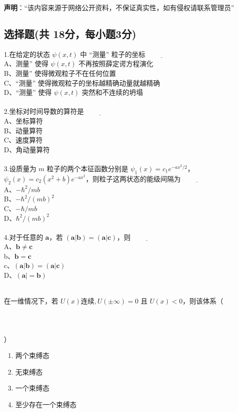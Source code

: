 
\textbf{声明}：“该内容来源于网络公开资料，不保证真实性，如有侵权请联系管理员”

\subsection{选择题(共 18分，每小题3分)}

1.在给定的状态 $\psi(x,t)$ 中 “测量” 粒子的坐标$\underline{\hspace{2cm}}$\\
    A、测量” 使得 $\psi(x,t)$ 不再按照薛定谔方程演化\\
    B、测量” 使得微观粒子不在任何位置\\
    C、“测量” 使得微观粒子的坐标越精确动量就越精确\\
    D、“测量” 使得 $\psi(x,t)$ 突然和不连续的坍塌\\\\
2.坐标对时间导数的算符是$\underline{\hspace{2cm}}$\\
    A、坐标算符 \\
    B、动量算符 \\
    C、速度算符 \\
    D、角动量算符\\\\
3.设质量为 $m$ 粒子的两个本征函数分别是 $\psi_1(x) = c_1e^{-ax^2/2}$，$\psi_2(x) = c_2(x^2+b)e^{-ax^2}$，则粒子这两状态的能级间隔为$\underline{\hspace{2cm}}$\\
    A、$-\hbar^2/mb$\\
    B、$-\hbar^2/(mb)^2$\\
    C、$-\hbar/mb$\\
    D、$\hbar^2/(mb)^2$\\\\
4.对于任意的 $\mathbf{a}$，若 $(\mathbf{a}|\mathbf{b}) = (\mathbf{a}|\mathbf{c})$，则$\underline{\hspace{2cm}}$\\
    A、$\mathbf{b} \ne \mathbf{c}$\\
    b、$\mathbf{b} = \mathbf{c}$\\
    c、$(\mathbf{a}| \mathbf{b}) = (\mathbf{a}| \mathbf{c})$\\
    D、$(\mathbf{a}| = \mathbf{b})$\\\\


\item  在一维情况下，若 $U(x) \text{连续}, U(\pm \infty) = 0$ 且 $U(x) < 0$，则该体系（\\ \\ \\ \\ ）
    \begin{enumerate}
    \item 两个束缚态
    \item 无束缚态
    \item 一个束缚态
    \item 至少存在一个束缚态
    \end{enumerate}
    
